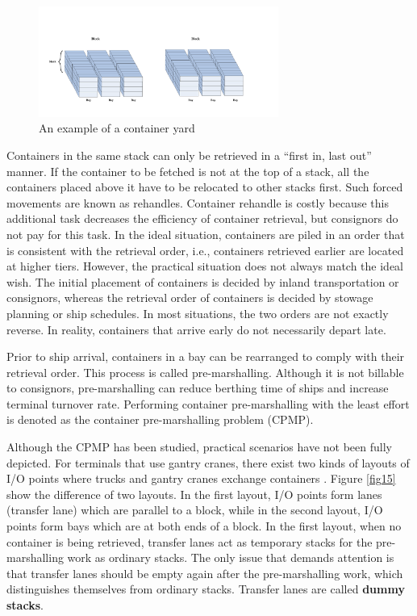 \documentclass[review,3p,times,authoryear,12pt]{elsarticle}
\begin{document}
\begin{figure}[!htb]
\centering
\includegraphics[width=0.7\textwidth]{fig1.pdf}
\caption{An example of a container yard}
\label{fig:1}
\end{figure}

Containers in the same stack can only be retrieved in a ``first in, last out'' manner. 
If the container to be fetched is not at the top of a stack, all the containers placed above it have to be relocated to other stacks first. 
Such forced movements are known as rehandles. 
Container rehandle is costly because this additional task decreases the efficiency of container retrieval, but consignors do not pay for this task. 
In the ideal situation, containers are piled in an order that is consistent with the retrieval order, i.e., containers retrieved earlier are located at higher tiers. 
However, the practical situation does not always match the ideal wish. 
The initial placement of containers is decided by inland transportation or consignors, whereas the retrieval order of containers is decided by stowage planning or ship schedules. In most situations, the two orders are not exactly reverse. In reality, containers that arrive early do not necessarily depart late.

Prior to ship arrival, containers in a bay can be rearranged to comply with their retrieval order. 
This process is called pre-marshalling. 
Although it is not billable to consignors, pre-marshalling can reduce berthing time of ships and increase terminal turnover rate. 
Performing container pre-marshalling with the least effort is denoted as the container pre-marshalling problem (CPMP).

Although the CPMP has been studied, practical scenarios have not been fully depicted. 
For terminals that use gantry cranes, there exist two kinds of layouts of I/O points where trucks and gantry cranes exchange containers \citep{Carlo2014}. 
Figure \ref{fig15} show the difference of two layouts. 
In the first layout, I/O points form lanes (transfer lane) which are parallel to a block, while in the second layout, I/O points form bays which are at both ends of a block. 
In the first layout, when no container is being retrieved, transfer lanes act as temporary stacks for the pre-marshalling work as ordinary stacks. 
The only issue that demands attention is that transfer lanes should be empty again after the pre-marshalling work, which distinguishes themselves from ordinary stacks. 
Transfer lanes are called \textbf{dummy stacks}.
\end{document}
